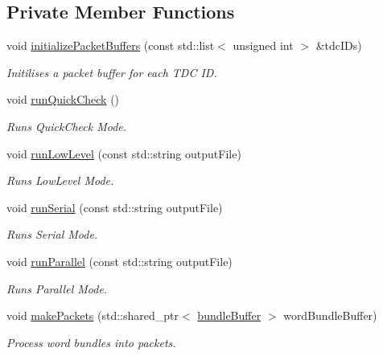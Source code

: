\subsection*{Private Member Functions}
\begin{DoxyCompactItemize}
\item 
void \hyperlink{class_processor_aa9ad1e9d6f3d217e23649e42cd07de90}{initialize\+Packet\+Buffers} (const std\+::list$<$ unsigned int $>$ \&tdc\+I\+Ds)
\begin{DoxyCompactList}\small\item\em Initilises a packet buffer for each T\+DC ID. \end{DoxyCompactList}\item 
void \hyperlink{class_processor_aa04640b32910d2daae25306f35ddcad8}{run\+Quick\+Check} ()
\begin{DoxyCompactList}\small\item\em Runs Quick\+Check Mode. \end{DoxyCompactList}\item 
void \hyperlink{class_processor_a3710adfb2311c70d9402e25a8615ace4}{run\+Low\+Level} (const std\+::string output\+File)
\begin{DoxyCompactList}\small\item\em Runs Low\+Level Mode. \end{DoxyCompactList}\item 
void \hyperlink{class_processor_adf50ef4f51094892e979ebd7cd15af04}{run\+Serial} (const std\+::string output\+File)
\begin{DoxyCompactList}\small\item\em Runs Serial Mode. \end{DoxyCompactList}\item 
void \hyperlink{class_processor_a32965f4a6587e9bf54eeeb11de43a4ad}{run\+Parallel} (const std\+::string output\+File)
\begin{DoxyCompactList}\small\item\em Runs Parallel Mode. \end{DoxyCompactList}\item 
void \hyperlink{class_processor_a554de487c5e8205872151fbedb315291}{make\+Packets} (std\+::shared\+\_\+ptr$<$ \hyperlink{class_processor_a531b4c5f7c0d810fc6e9e1dd3d115725}{bundle\+Buffer} $>$ word\+Bundle\+Buffer)
\begin{DoxyCompactList}\small\item\em Process word bundles into packets. \end{DoxyCompactList}\item 

\end{DoxyCompactItemize}
